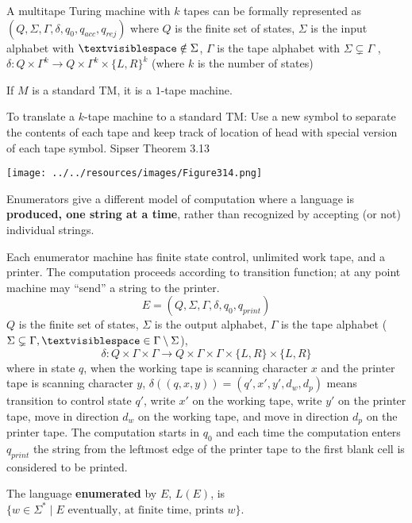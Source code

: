 \documentclass[12pt, oneside]{article}
\begin{document}
\vfill 

 A multitape Turing machine with $k$ tapes
can be formally represented as 
$(Q, \Sigma,  \Gamma, \delta, q_0, q_{acc}, q_{rej})$ 
where $Q$ is the finite set of  states,
$\Sigma$ is the  input alphabet with  $\textvisiblespace \notin \Sigma$,
$\Gamma$  is the  tape alphabet with $\Sigma \subsetneq \Gamma$ ,
$\delta: Q\times \Gamma^k\to Q \times \Gamma^k \times \{L,R\}^k$ 
(where $k$ is  the number of  states)


If $M$ is a standard  TM, it is a $1$-tape machine.


To translate a $k$-tape machine  to  a standard TM:
Use a  new symbol to separate the contents of each tape
and keep track of location of  head with  special version of each
tape symbol. {\tiny Sipser Theorem 3.13} 

\texttt{[image: ../../resources/images/Figure314.png]}

\newpage
{} Enumerators give a different
model of computation where a language is {\bf produced, one string at a time},
rather than recognized by accepting (or not) individual strings.

Each enumerator machine has finite state control, unlimited work tape, and a printer. The computation proceeds
according to transition function; at any point machine may ``send'' a string to the printer.
\[
E  = (Q, \Sigma, \Gamma, \delta, q_0, q_{print})  
\]
$Q$ is the finite set of states, $\Sigma$ is  the output alphabet, $\Gamma$ is the 
tape alphabet ($\Sigma  \subsetneq\Gamma, 
\textvisiblespace \in \Gamma \setminus \Sigma$), 
\[
\delta:  Q  \times  \Gamma \times \Gamma \to  Q \times  \Gamma \times  \Gamma \times \{L, R\} \times  \{L, R\}
\]
where in state $q$, when the working tape is scanning character $x$ and the printer tape is scanning character $y$,
$\delta( (q,x,y) ) = (q', x', y', d_w, d_p)$ means transition to control state $q'$, write $x'$ on 
the working tape, write $y'$ on the printer tape, move in direction $d_w$ on the working tape, and move in direction 
$d_p$ on the printer tape. The computation starts in $q_0$ and each time the computation enters $q_{print}$
the string from the leftmost edge of the printer tape to the first blank cell is considered to be printed.

The language  {\bf  enumerated} by  $E$, $L(E)$, is $\{ w \in \Sigma^* \mid \text{$E$ eventually, at finite  time, 
prints $w$} \}$.
\end{document}
